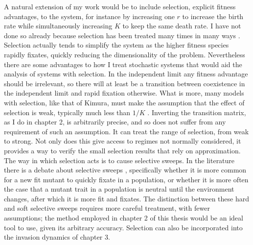 A natural extension of my work would be to include selection, explicit fitness advantages, to the system, for instance by increasing one $r$ to increase the birth rate while simultaneously increasing $K$ to keep the same death rate. 
I have not done so already because selection has been treated many times in many ways \cite{Chesson2000,Kawecki2004,Orr2005,Lambert2006,Leibold2006,Desai2007,Parsons2007,Patwa2008,Mayfield2010,Lin2012,Constable2016}. 
Selection actually tends to simplify the system as the higher fitness species rapidly fixates, quickly reducing the dimensionality of the problem. 
Nevertheless there are some advantages to how I treat stochastic systems that would aid the analysis of systems with selection. 
In the independent limit any fitness advantage should be irrelevant, so there will at least be a transition between coexistence in the independent limit and rapid fixation otherwise. 
What is more, many models with selection, like that of Kimura, must make the assumption that the effect of selection is weak, typically much less than $1/K$ \cite{Kimura1964,Kimura1969,Kimura1983}. %
Inverting the transition matrix, as I do in chapter 2, is arbitrarily precise, and so does not suffer from any requirement of such an assumption. 
It can treat the range of selection, from weak to strong. 
Not only does this give access to regimes not normally considered, it provides a way to verify the small selection results that rely on approximation. 
The way in which selection acts is to cause selective sweeps. 
In the literature there is a debate about selective sweeps \cite{Jensen2014}, specifically whether it is more common for a new fit mutant to quickly fixate in a population, or whether it is more often the case that a mutant trait in a population is neutral until the environment changes, after which it is more fit and fixates. 
The distinction between these hard and soft selective sweeps requires more careful treatment, with fewer assumptions; the method employed in chapter 2 of this thesis would be an ideal tool to use, given its arbitrary accuracy. 
Selection can also be incorporated into the invasion dynamics of chapter 3. 

